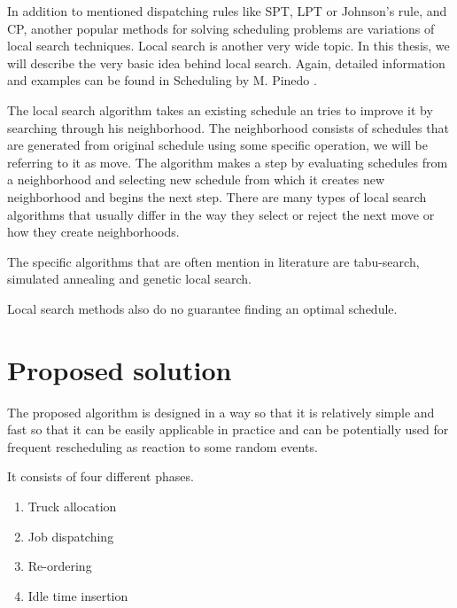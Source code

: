 \documentclass{ctuthesis}
\begin{document}
In addition to mentioned dispatching rules like SPT, LPT or Johnson's rule, and CP, another popular methods for solving scheduling problems are variations of local search techniques. Local search is another very wide topic. In this thesis, we will describe the very basic idea behind local search. Again, detailed information and examples can be found in Scheduling by M. Pinedo \cite{pinedo}. 

The local search algorithm takes an existing schedule an tries to improve it by searching through his neighborhood. The neighborhood consists of schedules that are generated from original schedule using some specific operation, we will be referring to it as move. The algorithm makes a step by evaluating schedules from a neighborhood and selecting new schedule from which it creates new neighborhood and begins the next step. There are many types of local search algorithms that usually differ in the way they select or reject the next move or how they create neighborhoods. 

The specific algorithms that are often mention in literature are tabu-search, simulated annealing and genetic local search.


Local search methods also do no guarantee finding an optimal schedule.

\chapter{Proposed solution}
\label{ch:Proposed solution}

The proposed algorithm is designed in a way so that it is relatively simple and fast so that it can be easily applicable in practice and can be potentially used for frequent rescheduling as reaction to some random events.

It consists of four different phases.

\begin{enumerate}
    \item Truck allocation
    \item Job dispatching
    \item Re-ordering
    \item Idle time insertion
\end{enumerate}
\end{document}
